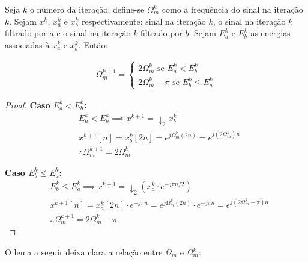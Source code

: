 \vspace{1cm}
\begin{lemma}
\label{lma:update}
Seja $k$ o número da iteração, define-se $\Omega_m^k$ como a frequência do sinal na iteração $k$. Sejam $x^k$, $x_a^k$ e $x_b^k$ respectivamente: sinal na iteração $k$, o sinal na iteração $k$ filtrado por $a$ e o sinal na iteração $k$ filtrado por $b$. Sejam $E_a^k$ e $E_b^k$ as energias associadas à $x_a^k$ e $x_b^k$. Então:

\begin{align*}
    \Omega_m^{k+1} =
    \begin{cases}
        2\Omega_m^k \text{ se } E_a^k < E_b^k\\
        2\Omega_m^k - \pi \text{ se } E_b^k \leq E_a^k
    \end{cases}
\end{align*}
\begin{proof}

    \medskip
    \textbf{Caso $E_a^k < E_b^k$:}
    \begin{align*}
        &E_a^k < E_b^k \implies x^{k+1} = \downarrow_2 x_b^k\\
        &x^{k+1}[n] = x_b^k[2n] = e^{j\Omega_m^k (2n)} = e^{j(2\Omega_m^k)n}\\
        &\therefore \Omega_m^{k+1} = 2\Omega_m^k
    \end{align*}

    \medskip
    \textbf{Caso $E_b^k \leq E_a^k$:}
    \begin{align*}
        &E_b^k \leq E_a^k \implies x^{k+1} = \downarrow_2 (x_a^k \cdot e^{-j\pi n/2})\\
        &x^{k+1}[n] = x_a^k[2n] \cdot e^{-j\pi n} = e^{j\Omega_m^k(2n)} \cdot e^{-j\pi n} = e^{j(2\Omega_m^k - \pi)n}\\
        &\therefore \Omega_m^{k+1} = 2\Omega_m^k - \pi
    \end{align*}
\end{proof}
\end{lemma}

O lema a seguir deixa clara a relação entre $\Omega_m$ e $\Omega_m^k$:

